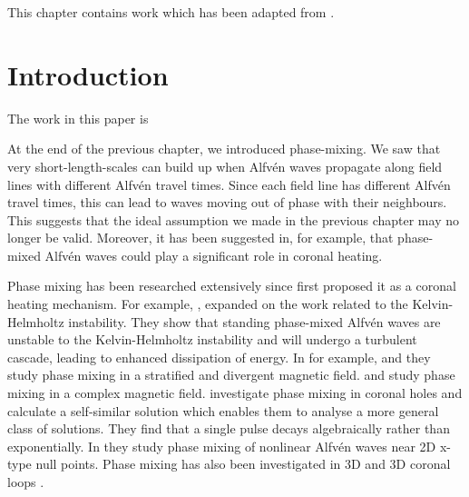 This chapter contains work which has been adapted from \citet{Prokopyszyn2019b}.

\section{Introduction}
\label{sec:chap_3_introduction}

The work in this paper is 

At the end of the previous chapter, we introduced phase-mixing. We saw that very short-length-scales can build up when Alfv\'en waves propagate along field lines with different Alfv\'en travel times. Since each field line has different Alfv\'en travel times, this can lead to waves moving out of phase with their neighbours. This suggests that the ideal assumption we made in the previous chapter may no longer be valid. Moreover, it has been suggested in, for example, \citet{Heyvaerts1983} that phase-mixed Alfv\'en waves could play a significant role in coronal heating.

Phase mixing has been researched extensively since \citet{Heyvaerts1983} first proposed it as a coronal heating mechanism. For example, \citet{Browning1984}, expanded on the \citet{Heyvaerts1983} work related to the Kelvin-Helmholtz instability. They show that standing phase-mixed Alfv\'en waves are unstable to the Kelvin-Helmholtz instability and will undergo a turbulent cascade, leading to enhanced dissipation of energy. In for example, \citet{DeMoortel2002} and \citet{Smith2007} they study phase mixing in a stratified and divergent magnetic field. \citet{Similon1989} and \citet{Howson2019} study phase mixing in a complex magnetic field. \citet{Hood1997,Hood2002} investigate phase mixing in coronal holes and calculate a self-similar solution which enables them to analyse a more general class of solutions. They find that a single pulse decays algebraically rather than exponentially. In \citet{McLaughlin2011a,McLaughlin2013,Prokopyszyn2019a} they study phase mixing of nonlinear Alfv\'en waves near 2D x-type null points. Phase mixing has also been investigated in 3D \citep{Magyar2017} and 3D coronal loops \citep{Pagano2017,Pagano2018}.

